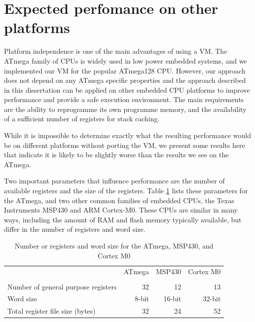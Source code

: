 \section{Expected perfomance on other platforms}
\label{sec-evaluation-other-platforms}
Platform independence is one of the main advantages of using a VM. The ATmega family of CPUs is widely used in low power embedded systems, and we implemented our VM for the popular ATmega128 CPU. However, our approach does not depend on any ATmega specific properties and the approach described in this dissertation can be applied on other embedded CPU platforms to improve performance and provide a safe execution environment. The main requirements are the ability to reprogramme its own programme memory, and the availability of a sufficient number of registers for stack caching.

While it is impossible to determine exactly what the resulting performance would be on different platforms without porting the VM, we present some results here that indicate it is likely to be slightly worse than the results we see on the ATmega.

Two important parameters that influence performance are the number of available registers and the size of the registers. Table \ref{tbl-ATmega-msp430-m0-registers} lists these parameters for the ATmega, and two other common families of embedded CPUs, the Texas Instruments MSP430 and ARM Cortex-M0. These CPUs are similar in many ways, including the amount of RAM and flash memory typically available, but differ in the number of registers and word size.

\begin{table}
\caption{Number or registers and word size for the ATmega, MSP430, and Cortex M0}
\label{tbl-ATmega-msp430-m0-registers}
    \begin{tabular}{lrrr} %
    \toprule
                                           & ATmega       & MSP430     & Cortex M0 \\
                                           & \cite{Atmel:ATmega128Datasheet, Atmel:AVRInstructionSetManual}
                                           & \cite{TexasInstrumentsIncorporated:MSP430F1611Datasheet, TexasInstrumentsIncorporated:MSP430x1xxUsersGuide}
                                           & \cite{ARM:2009vz} \\
    \midrule
    \midrule
    Number of general purpose registers    & 32           & 12         & 13        \\
    Word size                              & 8-bit        & 16-bit     & 32-bit    \\
    Total register file size (bytes)       & 32           & 24         & 52        \\
    \bottomrule
    \end{tabular}
\end{table}

